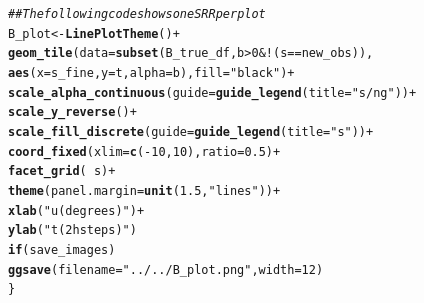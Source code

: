 \documentclass[a4paper,11pt]{article}\usepackage[]{graphicx}\usepackage[]{color}
\makeatletter
\newcommand{\hlnum}[1]{\textcolor[rgb]{0.686,0.059,0.569}{#1}}%
\newcommand{\hlstr}[1]{\textcolor[rgb]{0.192,0.494,0.8}{#1}}%
\newcommand{\hlcom}[1]{\textcolor[rgb]{0.678,0.584,0.686}{\textit{#1}}}%
\newcommand{\hlopt}[1]{\textcolor[rgb]{0,0,0}{#1}}%
\newcommand{\hlstd}[1]{\textcolor[rgb]{0.345,0.345,0.345}{#1}}%
\newcommand{\hlkwa}[1]{\textcolor[rgb]{0.161,0.373,0.58}{\textbf{#1}}}%
\newcommand{\hlkwb}[1]{\textcolor[rgb]{0.69,0.353,0.396}{#1}}%
\newcommand{\hlkwc}[1]{\textcolor[rgb]{0.333,0.667,0.333}{#1}}%
\newcommand{\hlkwd}[1]{\textcolor[rgb]{0.737,0.353,0.396}{\textbf{#1}}}%
\newenvironment{kframe}{%
 \def\at@end@of@kframe{}%
 \ifinner\ifhmode%
  \def\at@end@of@kframe{\end{minipage}}%
  \begin{minipage}{\columnwidth}%
 \fi\fi%
 \def\FrameCommand##1{\hskip\@totalleftmargin \hskip-\fboxsep
 \colorbox{shadecolor}{##1}\hskip-\fboxsep
     \hskip-\linewidth \hskip-\@totalleftmargin \hskip\columnwidth}%
 \MakeFramed {\advance\hsize-\width
   \@totalleftmargin\z@ \linewidth\hsize
   \@setminipage}}%
 {\par\unskip\endMakeFramed%
 \at@end@of@kframe}
\newenvironment{knitrout}{}{} %
\makeatother
\begin{document}
\begin{knitrout}
\begin{kframe}
\begin{alltt}
  \hlcom{## The following code shows one SRR per plot  }
  \hlstd{B_plot} \hlkwb{<-} \hlkwd{LinePlotTheme}\hlstd{()} \hlopt{+}
    \hlkwd{geom_tile}\hlstd{(}\hlkwc{data}\hlstd{=}\hlkwd{subset}\hlstd{(B_true_df,b}\hlopt{>}\hlnum{0} \hlopt{& !}\hlstd{(s}\hlopt{==}\hlstd{new_obs)),}
              \hlkwd{aes}\hlstd{(}\hlkwc{x}\hlstd{=s_fine,}\hlkwc{y}\hlstd{=t,}\hlkwc{alpha}\hlstd{=b),}\hlkwc{fill}\hlstd{=}\hlstr{"black"}\hlstd{)} \hlopt{+}
    \hlkwd{scale_alpha_continuous}\hlstd{(}\hlkwc{guide}\hlstd{=}\hlkwd{guide_legend}\hlstd{(}\hlkwc{title}\hlstd{=}\hlstr{"s/ng"}\hlstd{))} \hlopt{+}
    \hlkwd{scale_y_reverse}\hlstd{()}\hlopt{+}
    \hlkwd{scale_fill_discrete}\hlstd{(}\hlkwc{guide}\hlstd{=}\hlkwd{guide_legend}\hlstd{(}\hlkwc{title}\hlstd{=}\hlstr{"s"}\hlstd{))} \hlopt{+}
    \hlkwd{coord_fixed}\hlstd{(}\hlkwc{xlim}\hlstd{=}\hlkwd{c}\hlstd{(}\hlopt{-}\hlnum{10}\hlstd{,}\hlnum{10}\hlstd{),}\hlkwc{ratio} \hlstd{=} \hlnum{0.5}\hlstd{)}  \hlopt{+}
    \hlkwd{facet_grid}\hlstd{(}\hlopt{~}\hlstd{s)} \hlopt{+}
    \hlkwd{theme}\hlstd{(}\hlkwc{panel.margin} \hlstd{=} \hlkwd{unit}\hlstd{(}\hlnum{1.5}\hlstd{,} \hlstr{"lines"}\hlstd{))} \hlopt{+}
    \hlkwd{xlab}\hlstd{(}\hlstr{"u (degrees)"}\hlstd{)} \hlopt{+}
    \hlkwd{ylab}\hlstd{(}\hlstr{"t (2 h steps)"}\hlstd{)}
  \hlkwa{if}\hlstd{(save_images)}
    \hlkwd{ggsave}\hlstd{(}\hlkwc{filename} \hlstd{=} \hlstr{"../../B_plot.png"}\hlstd{,}\hlkwc{width}\hlstd{=}\hlnum{12}\hlstd{)}
\hlstd{\}}
\end{alltt}
\end{kframe}
\end{knitrout}
\end{document}
